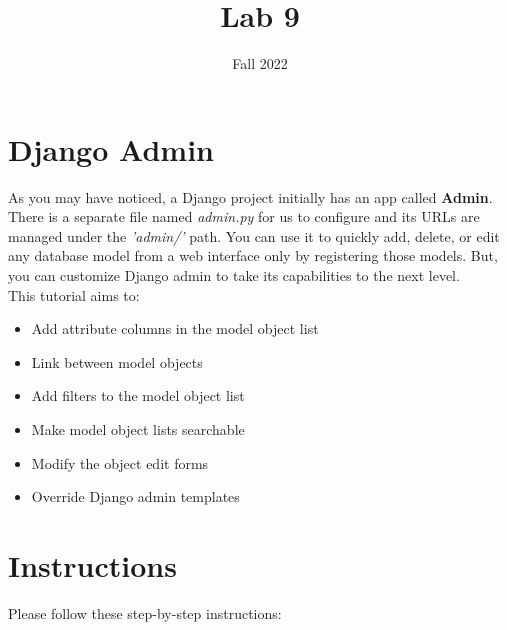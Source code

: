 \documentclass{homework}
\author{}
\date{Fall 2022}
\title{Lab 9}
\begin{document}
 \maketitle

\section*{Django Admin}
As you may have noticed, a Django project initially has an app called \textbf{Admin}. There is a separate file named \textit{admin.py} for us to configure and its URLs are managed under the \textit{'admin/'} path. You can use it to quickly add, delete, or edit any database model from a web interface only by registering those models. But, you can customize Django admin to take its capabilities to the next level.
\\
This tutorial aims to:
\begin{itemize}
    \item Add attribute columns in the model object list
    \item Link between model objects
    \item Add filters to the model object list
    \item Make model object lists searchable
    \item Modify the object edit forms
    \item Override Django admin templates
\end{itemize}

\section*{Instructions}
Please follow these step-by-step instructions:
\end{document}
